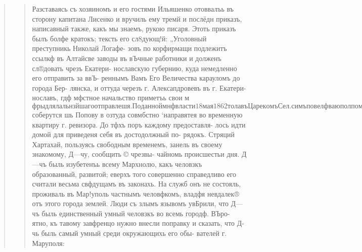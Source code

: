 \begin{quote}
\begin{quote}
Разставаясь съ хозяиномъ и его гостями Ильяшенко
отоввалъь въ сторону капитана Лисенко и вручиль ему тремй
и послёдн приказъ, написавный также, какъ мы знаемъ,
рукою писаря. Этоть приказъ былъ болфе кратокъ; тексть
его сл8дующ!й: „Уголовный преступникь Николай Логафе-
зовъ по корфирмащи подлежитъ ссылкф въ Алтайсве заводы
въ вЪчные работники и долженъ сл®довать чрезъ Екатери-
нославскую губернию, куда немедленно его отправить за ввЪ-
реннымъ Вамъ Его Величества карауломъ до города Бер-
лянска, и оттуда черезъ г. Алексапдровевъ въ г. Екатери-
нославъ, гдф мфстное начальство приметъь свои м$фры для
лальнзйшаго отправлешя. По данной мнф власти 18 мая
1862 тола въ Царекомъ Сел. симъ повелфваю полпомочеп-
ный Государя моего и вфрноподданный Григорй Власовъ
Ильяшенко. Г. Маруполь, 6 апрфля 18683 года, зъ чаеъ
пополудни“. ,

Несмотря на выраженное ревизоромъ желан1, чтобы
никто пе утруждаль себя панесетемъ прощальнато визита,
Поповъ, тёмъ не менЪе, солидно разсуждая, что и излининее
усерме къ начальству только приносить’ пользу, тайно при-
казалъ своему кучеру замфтить домъ, у котораго остановился
начальникъ. Когда Ильяшенко разеталея съ Поповымъ, осталь-
пая компан, посовфтовавшись съ хозяиномт, рЬшила, что
общая явка къ внезапно прибывшему высокопоставленному
лицу безусловно необходима. ПорЪшили, что должны авиться
купно всЪ власти, имя во главф военную власть, капитана,
Лисенко; затЪмъ находили, что было бы весьма великолвоно,
если бы шестые властей замыгали главнЪйпие именитые
граждане г. Маруноля. Оповфетить послвднихъ обязались
члены суда, которые и не замедлили разбЪжаться по разнымъ
нонцамь города. Итакь было условлено, что часа черезъ два,
т. а. между тремя н четырьмя часами дня, ве$ соберутся
шь Попову в озтуда совмбстно ‘направятея во временную
квартиру г. ревизора. До тфхъ поръ каждому предоставля-
лось идти домой для приведеня себя въ достодолжный по-
рядокъ. Стряций Хартахай, пользуясь свободным временемъ,
занель въ своему знакомому, Д—чу, сообщить © чрезвы-
чайномь происшестьи дня. Д—чъ быль изубетенъь всему
Мархнолю, какъ человзкъ образованный, развитой; еверхъ
того совершенно справедливо его считали весьма свфдущамъ
въ законахь. На служб онъ не состояль, проживаль въ
Мар!уполь частнымъ человфкомъ, владфя невдалек® отъ этого
города землей. Люди съ злымъ язывомъ увБрили, что Д—чъ
быль единственный умный человзкъ во всемь городф. ВЪро-
ятно, къ тавому завфренцо нужно внесли поправку и сказать,
что Д-чь быль самый умный среди окружающихь его обы-
вателей г. Маруполя:


\end{quote}
\end{quote}
